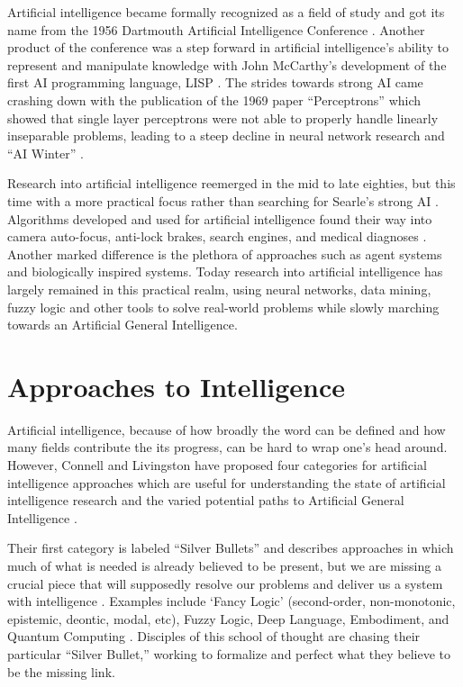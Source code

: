 \documentclass[oneside,12pt,openany]{book}
\begin{document}
	Artificial intelligence became formally recognized as a field of study and got its name from the 1956 Dartmouth Artificial Intelligence Conference \cite{Buchanan}. Another product of the conference was a step forward in artificial intelligence's ability to represent and manipulate knowledge with John McCarthy's development of the first AI programming language, LISP \cite{Jones}. The strides towards strong AI came crashing down with the publication of the 1969 paper ``Perceptrons'' which showed that single layer perceptrons were not able to properly handle linearly inseparable problems, leading to a steep decline in neural network research and ``AI Winter'' \cite{Jones}.
	
	Research into artificial intelligence reemerged in the mid to late eighties, but this time with a more practical focus rather than searching for Searle's strong AI \cite{Jones}. Algorithms developed and used for artificial intelligence found their way into camera auto-focus, anti-lock brakes, search engines, and medical diagnoses \cite{Jones}. Another marked difference is the plethora of approaches such as agent systems and biologically inspired systems. Today research into artificial intelligence has largely remained in this practical realm, using neural networks, data mining, fuzzy logic and other tools to solve real-world problems while slowly marching towards an Artificial General Intelligence.
	
	\section{Approaches to Intelligence}
	
	Artificial intelligence, because of how broadly the word can be defined and how many fields contribute the its progress, can be hard to wrap one's head around. However, Connell and Livingston have proposed four categories for artificial intelligence approaches which are useful for understanding the state of artificial intelligence research and the varied potential paths to Artificial General Intelligence \cite{Connell}.
	
	Their first category is labeled ``Silver Bullets'' and describes approaches in which much of what is needed is already believed to be present, but we are missing a crucial piece that will supposedly resolve our problems and deliver us a system with intelligence \cite{Connell}. Examples include `Fancy Logic' (second-order, non-monotonic, epistemic, deontic, modal, etc), Fuzzy Logic, Deep Language, Embodiment, and Quantum Computing \cite{Connell}. Disciples of this school of thought are chasing their particular ``Silver Bullet,'' working to formalize and perfect what they believe to be the missing link.
	
\end{document}
